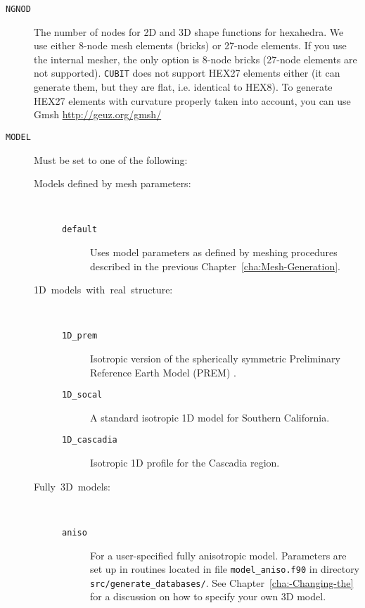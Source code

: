 \vspace{1cm}
\begin{description}
\item [{\texttt{NGNOD}}] The number of nodes for 2D and 3D shape functions
for hexahedra. We use either 8-node mesh elements (bricks) or 27-node
elements. If you use the internal mesher, the only option is 8-node
bricks (27-node elements are not supported). \texttt{CUBIT} does not
support HEX27 elements either (it can generate them, but they are
flat, i.e. identical to HEX8). To generate HEX27 elements with curvature
properly taken into account, you can use Gmsh \url{http://geuz.org/gmsh/}
\item [{\texttt{MODEL}}] Must be set to one of the following:

\begin{description}
\item [{\textmd{Models defined by mesh parameters:}}] ~

\begin{description}
\item [{\texttt{default}}] Uses model parameters as defined by meshing
procedures described in the previous Chapter~\ref{cha:Mesh-Generation}.
\end{description}

\item [{\textmd{1D~models~with~real~structure:}}] ~

\begin{description}
\item [{\texttt{1D\_prem}}] Isotropic version of the spherically symmetric
Preliminary Reference Earth Model (PREM) \citep{DzAn81}.
\item [{\texttt{1D\_socal}}] A standard isotropic 1D model for Southern
California.
\item [{\texttt{1D\_cascadia}}] Isotropic 1D profile for the Cascadia region.
\end{description}

\item [{\textmd{Fully~3D~models:}}] ~

\begin{description}
\item [{\texttt{aniso}}] For a user-specified fully anisotropic model.
Parameters are set up in routines located in file \texttt{model\_aniso.f90}
in directory \texttt{src/generate\_databases/}. See Chapter~\ref{cha:-Changing-the}
for a discussion on how to specify your own 3D model.


\end{description}
\end{description}
\end{description}
